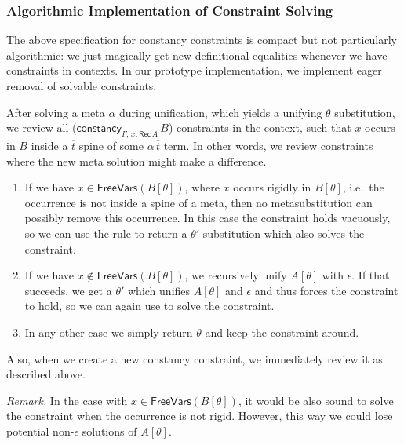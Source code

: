 \documentclass[acmsmall,screen,dvipsnames]{acmart}\settopmatter{}
\newcommand{\constancy}{\mathsf{constancy}}
\newcommand{\FreeVars}{\mathsf{FreeVars}}
\newcommand{\Rec}{\mathsf{Rec}}
\newcommand{\ol}[1]{\overline{#1}}
\theoremstyle{remark}
\begin{document}
\subsubsection{Algorithmic Implementation of Constraint Solving}
\label{sec:algorithmic}
The above specification for constancy constraints is compact but not
particularly algorithmic: we just magically get new definitional equalities
whenever we have constraints in contexts. In our prototype implementation, we
implement eager removal of solvable constraints.

After solving a meta $\alpha$ during unification, which yields a unifying
$\theta$ substitution, we review all ($\constancy_{\Gamma,\,x : \Rec\,A}\,B$)
constraints in the context, such that $x$ occurs in $B$ inside a $\ol{t}$ spine
of some $\alpha\,\ol{t}$ term. In other words, we review constraints where the
new meta solution might make a difference.
\begin{enumerate}
\item If we have $x \in \FreeVars(B[\theta])$, where $x$ occurs rigidly in
  $B[\theta]$, i.e.\ the occurrence is not inside a spine of a meta, then no
  metasubstitution can possibly remove this occurrence. In this case the
  constraint holds vacuously, so we can use the 
  rule to return a $\theta'$ substitution which also solves the constraint.
  \item If we have $x \notin \FreeVars(B[\theta])$, we recursively unify
    $A[\theta]$ with $\epsilon$. If that succeeds, we get a $\theta'$ which
    unifies $A[\theta]$ and $\epsilon$ and thus forces the constraint to hold,
    so we can again use  to solve the constraint.
  \item
    In any other case we simply return $\theta$ and keep the constraint around.
\end{enumerate}
Also, when we create a new constancy constraint, we immediately review it
as described above.

\emph{Remark.} In the case with $x \in \FreeVars(B[\theta])$, it would be also
sound to solve the constraint when the occurrence is not rigid. However, this
way we could lose potential non-$\epsilon$ solutions of $A[\theta]$.
\end{document}
